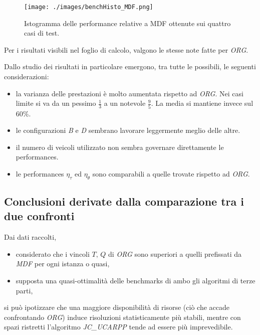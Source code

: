 \begin{figure}[H] 
 	\begin{center}\texttt{[image: ./images/benchHisto\_MDF.png]}
 	\end{center} 
 	\caption{Istogramma delle performance relative a MDF ottenute sui quattro casi di test.}
 	\label{fig:benchHisto_MDF}
\end{figure}

Per i risultati visibili nel foglio di calcolo, valgono le stesse note fatte per \emph{ORG}.

Dallo studio dei risultati in particolare emergono, tra tutte le possibili, le seguenti considerazioni:
\begin{itemize}
  \item la varianza delle prestazioni è molto aumentata rispetto ad \emph{ORG}. Nei casi limite si va da un pessimo $\frac{1}{3}$ a un notevole $\frac{9}{5}$. La media si mantiene invece sul 60\%.
  \item le configurazioni \emph{B} e \emph{D} sembrano lavorare leggermente meglio delle altre.
  \item il numero di veicoli utilizzato non sembra governare direttamente le performances.
  \item le performances $\eta_\tau$ ed $\eta_\theta$ sono comparabili a quelle trovate rispetto ad \emph{ORG}.
\end{itemize}

\subsection{Conclusioni derivate dalla comparazione tra i due confronti}
Dai dati raccolti,
\begin{itemize} 
  \item considerato che i vincoli $T,\,Q$ di \emph{ORG} sono superiori a quelli prefissati da \emph{MDF} per ogni istanza o quasi,
  \item supposta una quasi-ottimalità delle benchmarks di ambo gli algoritmi di terze parti,
\end{itemize}
 si può ipotizzare che una maggiore disponibilità di risorse (ciò che accade confrontando \emph{ORG}) induce risoluzioni statisticamente più stabili, mentre con spazi ristretti
 l'algoritmo \emph{JC\_UCARPP} tende ad essere più imprevedibile.
